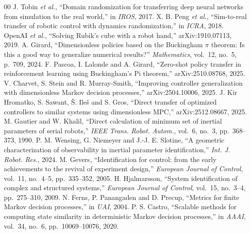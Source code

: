 \documentclass[conference]{IEEEtran}
\begin{document}
\begin{thebibliography}{00}
 J. Tobin \emph{et al.}, ``Domain randomization for
transferring deep neural networks from simulation to the real world,'' in
\emph{IROS}, 2017.
 X. B. Peng \emph{et al.}, ``Sim-to-real transfer of robotic
control with dynamics randomization,'' in \emph{ICRA}, 2018.
 OpenAI \emph{et al.}, ``Solving Rubik's cube with a robot
hand,'' arXiv:1910.07113, 2019.
 A. Girard, ``Dimensionless policies based on the
Buckingham $\pi$ theorem: Is this a good way to generalize numerical
results?'' \emph{Mathematics}, vol.~12, no.~5, p.~709, 2024.
 F. Pascoa, I. Lalonde and A. Girard, ``Zero-shot policy
transfer in reinforcement learning using Buckingham's Pi theorem,''
arXiv:2510.08768, 2025.
 V. Charvet, S. Stein and R. Murray-Smith, ``Improving
controller generalization with dimensionless Markov decision processes,''
arXiv:2504.10006, 2025.
 J. Kir Hromatko, S. Sawant, \v{S}. Ile\v{s} and
S. Gros, ``Direct transfer of optimized controllers to similar systems using
dimensionless MPC,'' arXiv:2512.08667, 2025.
 M. Gautier and W. Khalil, ``Direct calculation of minimum
set of inertial parameters of serial robots,'' \emph{IEEE Trans. Robot.
Autom.}, vol.~6, no.~3, pp.~368--373, 1990.
 P. M. Wensing, G. Niemeyer and J.-J. E. Slotine, ``A
geometric characterization of observability in inertial parameter
identification,'' \emph{Int. J. Robot. Res.}, 2024.
 M. Gevers, ``Identification for control: from the early
achievements to the revival of experiment design,'' \emph{European Journal of
Control}, vol.~11, no.~4--5, pp.~335--352, 2005.
 H. Hjalmarsson, ``System identification of complex and
structured systems,'' \emph{European Journal of Control}, vol.~15, no.~3--4,
pp.~275--310, 2009.
 N. Ferns, P. Panangaden and D. Precup, ``Metrics for finite
Markov decision processes,'' in \emph{UAI}, 2004.
 P. S. Castro, ``Scalable methods for computing state
similarity in deterministic Markov decision processes,'' in \emph{AAAI},
vol.~34, no.~6, pp.~10069--10076, 2020.
\end{thebibliography}
\end{document}
